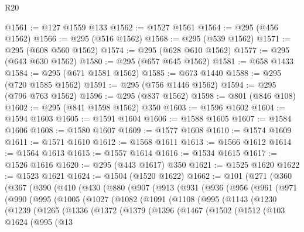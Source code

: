 \begin{lexlean}{R20}
\begin{coremodule}
{{{{{{{{{{{{{{{{{{{{{{{{{{{{{{{{{{{{{{{{{{{{{{{{{{{{{{{{{{{{{{{@1561 := @127 @1559 @133
@1562 := @1527 @1561
@1564 := @295 (@456 @1562)
@1566 := @295 (@516 @1562)
@1568 := @295 (@539 @1562)
@1571 := @295 (@608 @560 @1562)
@1574 := @295 (@628 @610 @1562)
@1577 := @295 (@643 @630 @1562)
@1580 := @295 (@657 @645 @1562)
@1581 := @658 @1433
@1584 := @295 (@671 @1581 @1562)
@1585 := @673 @1440
@1588 := @295 (@720 @1585 @1562)
@1591 := @295 (@756 @1446 @1562)
@1594 := @295 (@796 @763 @1562)
@1596 := @295 (@837 @1562)
@1598 := @801 (@846 @108)
@1602 := @295 (@841 @1598 @1562) @350
@1603 := @1596 @1602
@1604 := @1594 @1603
@1605 := @1591 @1604
@1606 := @1588 @1605
@1607 := @1584 @1606
@1608 := @1580 @1607
@1609 := @1577 @1608
@1610 := @1574 @1609
@1611 := @1571 @1610
@1612 := @1568 @1611
@1613 := @1566 @1612
@1614 := @1564 @1613
@1615 := @1557 @1614
@1616 := @1534 @1615
@1617 := @1526 @1616
@1620 := @295 (@443 @1617) @350
@1621 := @1525 @1620
@1622 := @1523 @1621
@1624 := @1504 (@1520 @1622)
@1662 := @101
    (@271
      (@360
        (@367
          (@390
            (@410
              (@430
                (@880
                  (@907
                    (@913
                      (@931
                        (@936
                          (@956
                            (@961
                              (@971
                                (@990
                                  (@995
                                    (@1005
                                      (@1027
                                        (@1082
                                          (@1091
                                            (@1108
                                              (@995
                                                (@1143
                                                  (@1230
                                                    (@1239
                                                      (@1265
                                                        (@1336
                                                          (@1372
                                                            (@1379
                                                              (@1396
                                                                (@1467
                                                                  (@1502
                                                                    (@1512
                                                                      (@103
                                                                        @1624
                                                                        (@995
                                                                          (@13
}}}}}}}}}}}}}}}}}}}}}}}}}}}}}}}}}}}}}}}}}}}}}}}}}}}}}}}}}}}}}}}
\end{coremodule}
\end{lexlean}
